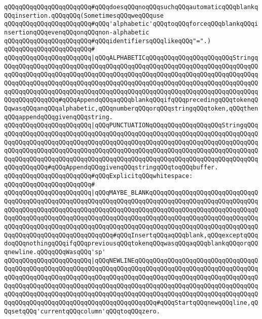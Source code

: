 \verb|qQQqqQQqqQQqqQQqqQQqqQQq#qQQqdoesqQQqnoqQQqsuchqQQqautomaticqQQqblankqQQqinsertion.qQQqqQQq(SometimesqQQqweqQQquse|\newline
\verb|qQQqqQQqqQQqqQQqqQQqqQQq#qQQq'alphabetic'qQQqtoqQQqforceqQQqblankqQQqinsertionqQQqevenqQQqonqQQqnon-alphabetic|\newline
\verb|qQQqqQQqqQQqqQQqqQQqqQQq#qQQqidentifiersqQQqlikeqQQq"=".)|\newline
\verb|qQQqqQQqqQQqqQQqqQQqqQQq#|\newline
\verb|qQQqqQQqqQQqqQQqqQQqqQQq|\verb#|qQQqALPHABETICqQQqqQQqqQQqqQQqqQQqqQQqStringqQQqqQQqqQQqqQQqqQQqqQQqqQQqqQQqqQQqqQQqqQQqqQQqqQQqqQQqqQQqqQQqqQQqqQQqqQQqqQQqqQQqqQQqqQQqqQQqqQQqqQQqqQQqqQQqqQQqqQQqqQQqqQQqqQQqqQQqqQQqqQQqqQQqqQQqqQQqqQQqqQQqqQQqqQQqqQQqqQQqqQQqqQQqqQQqqQQqqQQqqQQqqQQqqQQqqQQqqQQqqQQqqQQqqQQqqQQqqQQqqQQqqQQqqQQqqQQqqQQqqQQqqQQqqQQqqQQqqQQqqQQqqQQqqQQqqQQq#\verb|#qQQqAppendqQQqaqQQqblankqQQqifqQQqprecedingqQQqtokenqQQqwasqQQqanqQQqalphabetic,qQQqnumberqQQqorqQQqstringqQQqtoken,qQQqthenqQQqappendqQQqgivenqQQqstring.|\newline
\verb|qQQqqQQqqQQqqQQqqQQqqQQq|\verb#|qQQqPUNCTUATIONqQQqqQQqqQQqqQQqqQQqStringqQQqqQQqqQQqqQQqqQQqqQQqqQQqqQQqqQQqqQQqqQQqqQQqqQQqqQQqqQQqqQQqqQQqqQQqqQQqqQQqqQQqqQQqqQQqqQQqqQQqqQQqqQQqqQQqqQQqqQQqqQQqqQQqqQQqqQQqqQQqqQQqqQQqqQQqqQQqqQQqqQQqqQQqqQQqqQQqqQQqqQQqqQQqqQQqqQQqqQQqqQQqqQQqqQQqqQQqqQQqqQQqqQQqqQQqqQQqqQQqqQQqqQQqqQQqqQQqqQQqqQQqqQQqqQQqqQQqqQQqqQQqqQQqqQQqqQQq#\verb|#qQQqAppendqQQqgivenqQQqstringqQQqtoqQQqbuffer.|\newline
\newline
\verb|qQQqqQQqqQQqqQQqqQQqqQQq#qQQqExplicitqQQqwhitespace:|\newline
\verb|qQQqqQQqqQQqqQQqqQQqqQQq#|\newline
\verb|qQQqqQQqqQQqqQQqqQQqqQQq|\verb#|qQQqMAYBE_BLANKqQQqqQQqqQQqqQQqqQQqqQQqqQQqqQQqqQQqqQQqqQQqqQQqqQQqqQQqqQQqqQQqqQQqqQQqqQQqqQQqqQQqqQQqqQQqqQQqqQQqqQQqqQQqqQQqqQQqqQQqqQQqqQQqqQQqqQQqqQQqqQQqqQQqqQQqqQQqqQQqqQQqqQQqqQQqqQQqqQQqqQQqqQQqqQQqqQQqqQQqqQQqqQQqqQQqqQQqqQQqqQQqqQQqqQQqqQQqqQQqqQQqqQQqqQQqqQQqqQQqqQQqqQQqqQQqqQQqqQQqqQQqqQQqqQQqqQQqqQQqqQQqqQQqqQQqqQQqqQQqqQQqqQQqqQQqqQQqqQQq#\verb|#qQQqInsertqQQqaqQQqblank,qQQqexceptqQQqdoqQQqnothingqQQqifqQQqpreviousqQQqtokenqQQqwasqQQqaqQQqblankqQQqorqQQqnewline.qQQqqQQqWasqQQq'sp'|\newline
\verb|qQQqqQQqqQQqqQQqqQQqqQQq|\verb#|qQQqNEWLINEqQQqqQQqqQQqqQQqqQQqqQQqqQQqqQQqqQQqqQQqqQQqqQQqqQQqqQQqqQQqqQQqqQQqqQQqqQQqqQQqqQQqqQQqqQQqqQQqqQQqqQQqqQQqqQQqqQQqqQQqqQQqqQQqqQQqqQQqqQQqqQQqqQQqqQQqqQQqqQQqqQQqqQQqqQQqqQQqqQQqqQQqqQQqqQQqqQQqqQQqqQQqqQQqqQQqqQQqqQQqqQQqqQQqqQQqqQQqqQQqqQQqqQQqqQQqqQQqqQQqqQQqqQQqqQQqqQQqqQQqqQQqqQQqqQQqqQQqqQQqqQQqqQQqqQQqqQQqqQQqqQQqqQQqqQQqqQQqqQQqqQQqqQQqqQQqqQQq#\verb|#qQQqStartqQQqnewqQQqline,qQQqsetqQQq'currentqQQqcolumn'qQQqtoqQQqzero.|\newline
